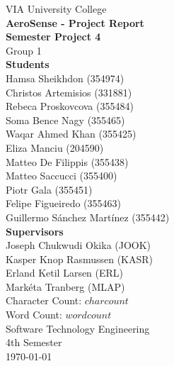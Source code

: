 \thispagestyle{empty}
\vspace*{0.15\textheight}
\begin{center}
    {\Large VIA University College}\\[2em]
    {\huge \textbf{AeroSense - Project Report}}\\[0.5em]
    {\Large \textbf{Semester Project 4}}\\[0.5em]
    {\Large Group 1}\\[3em]
    {\large \textbf{Students}}\\[0.5em]
    {\large Hamsa Sheikhdon (354974)}\\[0.5em]
    {\large Christos Artemisios (331881)}\\[0.5em]
    {\large Rebeca Proskovcova (355484)}\\[0.5em]
    {\large Soma Bence Nagy (355465)}\\[0.5em]
    {\large Waqar Ahmed Khan (355425)}\\[0.5em]
    {\large Eliza Manciu (204590)}\\[0.5em]
    {\large Matteo De Filippis (355438)}\\[0.5em]
    {\large Matteo Saccucci (355400)}\\[0.5em]
    {\large Piotr Gala (355451)}\\[0.5em]
    {\large Felipe Figueiredo (355463)}\\[0.5em]
    {\large Guillermo Sánchez Martínez (355442)}\\[2em]
    {\large \textbf{Supervisors}}\\[0.5em]
    {\large Joseph Chukwudi Okika (JOOK)}\\[0.5em]
    {\large Kasper Knop Rasmussen (KASR)}\\[0.5em]
    {\large Erland Ketil Larsen (ERL)}\\[0.5em]
    {\large Markéta Tranberg (MLAP)}\\[2em]
    {\large Character Count: $charcount$}\\[0.5em]
    {\large Word Count: $wordcount$}\\[2em]
    {\Large Software Technology Engineering}\\[1em]
    {\Large 4th Semester}\\[1em]
    {\large \today}\\[1em]
\end{center}
\vfill
\clearpage